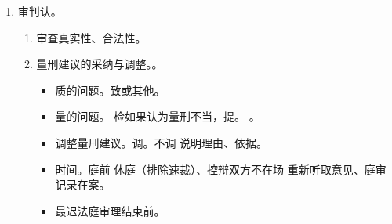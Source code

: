 \begin{enumerate}
\begin{enumerate}
\begin{enumerate}
\begin{enumerate}
\begin{itemize}
                                  \item 签了具有。
                                \end{itemize}
                                \begin{kk}{具结书效力/约束力问题}
                                  \begin{itemize}
                                    \item 对当事人。一般不得反悔。
                                    \item 对检察院。一般不得变更 \hz 撤回。
                                    \item 对法院。一般应当采纳指控的罪名和量刑建议。
                                  \end{itemize}
                                \end{kk}
                          \item 检察院应当提出。\yi 量刑建议书 \hz 起诉书写明。\er 原则确定型，新类型可幅度。
                                。
                        \end{enumerate}
                  \item 审判认。
                        \begin{enumerate}
                          \item 审查真实性、合法性。
                          \item 量刑建议的采纳与调整。。
                                \begin{itemize}
                                  \item 质的问题。致或其他。
                                  \item 量的问题。 \yjt
                                        检如果认为量刑不当，提。
                                        。
                                  \item 调整量刑建议。\yi 调。\er 不调 \yjt 说明理由、依据。
                                  \item 时间。庭前 \hz 休庭（排除速裁）、控辩双方不在场 \yjt 重新听取意见、庭审 \yjt 记录在案。
                                  \item 最迟法庭审理结束前。
                                \end{itemize}

\end{enumerate}
\end{enumerate}
\end{enumerate}
\end{enumerate}

